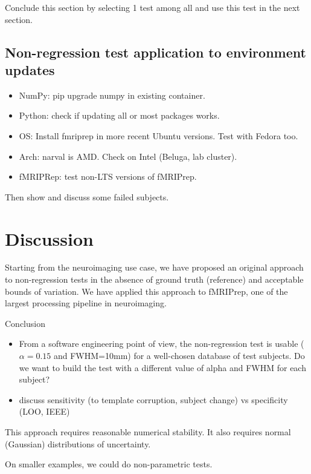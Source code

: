 \documentclass{article}
\begin{document}
Conclude this section by selecting 1 test among all and use this test in the
next section.

\subsection{Non-regression test application to environment updates}

\begin{itemize}
    \item NumPy: pip upgrade numpy in existing container.
    \item Python: check if updating all or most packages works.
    \item OS: Install fmriprep in more recent Ubuntu versions. Test with Fedora
          too.
    \item Arch: narval is AMD. Check on Intel (Beluga, lab cluster).
    \item fMRIPRep: test non-LTS versions of fMRIPrep.
\end{itemize}


Then show and discuss some failed subjects.


\section{Discussion}

Starting from the neuroimaging use case, we have proposed an original approach
to non-regression tests in the absence of ground truth (reference) and
acceptable bounds of variation. We have applied this approach to fMRIPrep, one
of the largest processing pipeline in neuroimaging.

Conclusion
\begin{itemize}
    \item From a software engineering point of view, the non-regression test is usable
          ($\alpha=0.15$ and FWHM=10mm) for a well-chosen database of test subjects. Do we want
          to build the test with a different value of alpha and FWHM for each subject?
    \item discuss sensitivity (to template corruption, subject change) vs specificity (LOO, IEEE)
\end{itemize}


This approach requires reasonable numerical stability. It also requires normal
(Gaussian) distributions of uncertainty.

On smaller examples, we could do non-parametric tests.
\end{document}
